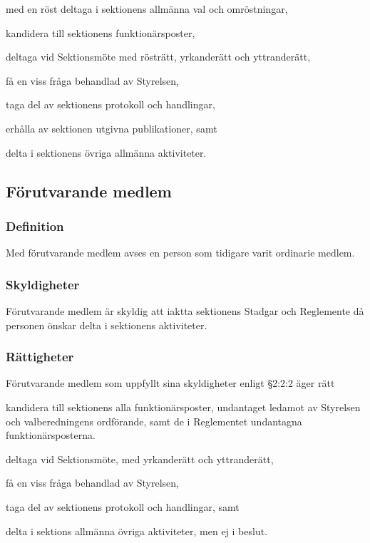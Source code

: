 \documentclass[10pt]{article}
\begin{document}
\begin{attlist}
\item med en röst deltaga i sektionens allmänna val och omröstningar,
\item kandidera till sektionens funktionärsposter,
\item deltaga vid Sektionsmöte med rösträtt, yrkanderätt och yttranderätt,
\item få en viss fråga behandlad av Styrelsen,
\item taga del av sektionens protokoll och handlingar,
\item erhålla av sektionen utgivna publikationer, samt
\item delta i sektionens övriga allmänna aktiviteter.
\end{attlist}


\subsection{Förutvarande medlem}
\subsubsection{Definition}
Med förutvarande medlem avses en person som tidigare varit ordinarie medlem.

\subsubsection{Skyldigheter}
Förutvarande medlem är skyldig att iaktta sektionens Stadgar och Reglemente
då personen önskar delta i sektionens aktiviteter.

\subsubsection{Rättigheter}
Förutvarande medlem som uppfyllt sina skyldigheter
enligt §2:2:2 äger rätt
\begin{attlist}
\item kandidera till sektionens alla funktionärsposter, undantaget ledamot av
    Styrelsen och valberedningens ordförande, samt de i
    Reglementet undantagna funktionärsposterna.
\item deltaga vid Sektionsmöte, med yrkanderätt och yttranderätt,
\item få en viss fråga behandlad av Styrelsen,
\item taga del av sektionens protokoll och handlingar, samt
\item delta i sektions allmänna övriga aktiviteter, men ej i beslut.
\end{attlist}
\end{document}
